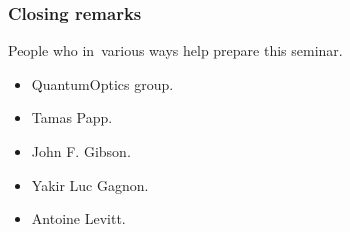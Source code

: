 \documentclass[10pt,t]{beamer}
\begin{document}
\begin{frame}
  \frametitle{Closing remarks}


  People who in~various ways help prepare this seminar.
  \begin{itemize}
    \RaggedRight

  \item QuantumOptics group.

  \item Tamas Papp.

  \item John F. Gibson.

  \item Yakir Luc Gagnon.

  \item Antoine Levitt.


  \end{itemize}

\end{frame}










\appendix





\end{document}
